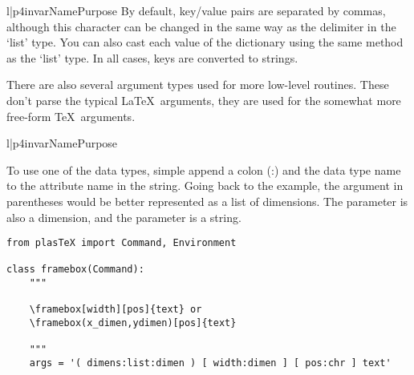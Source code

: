 \begin{tableii}{l|p{4in}}{var}{Name}{Purpose}
{    By default, key/value pairs are separated by commas, although this
    character can be changed in the same way as the delimiter in the
    `list' type.  You can also cast each value of the dictionary using
    the same method as the `list' type.  In all cases, keys are converted
    to strings.}
\end{tableii}

There are also several argument types used for more low-level routines.
These don't parse the typical \LaTeX\ arguments, they are used for
the somewhat more free-form \TeX\ arguments.
\begin{tableii}{l|p{4in}}{var}{Name}{Purpose}
\end{tableii}

To use one of the data types, simple append a colon (:) and the data
type name to the attribute name in the  string.
Going back to the  example, the argument in
parentheses would be better represented as a list of dimensions.
The  parameter is also a dimension, and the  parameter
is a string.
\begin{verbatim}
from plasTeX import Command, Environment

class framebox(Command):
    """

    \framebox[width][pos]{text} or
    \framebox(x_dimen,ydimen)[pos]{text}

    """
    args = '( dimens:list:dimen ) [ width:dimen ] [ pos:chr ] text'
\end{verbatim}


